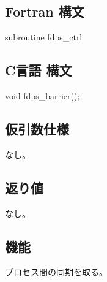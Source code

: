\subsection*{Fortran 構文}
\begin{screen}
\begin{spverbatim}
subroutine fdps_ctrl%
\end{spverbatim}
\end{screen}

\subsection*{C言語 構文}
\begin{screen}
\begin{spverbatim}
void fdps_barrier();
\end{spverbatim}
\end{screen}

\subsection*{仮引数仕様}
なし。

\subsection*{返り値}
なし。

\subsection*{機能}
プロセス間の同期を取る。
